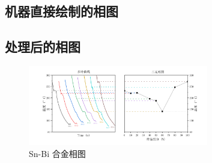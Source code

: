 \subsection{机器直接绘制的相图}
\begin{figure}[!ht]
    \begin{floatrow}
        \hspace{10mm}
    \end{floatrow}
\end{figure}
\subsection{处理后的相图}
\begin{figure}[!ht]
    \caption{Sn-Bi 合金相图}
    \includegraphics[width=0.7\textwidth]{img/A9/figwjj.pdf}
\end{figure}

